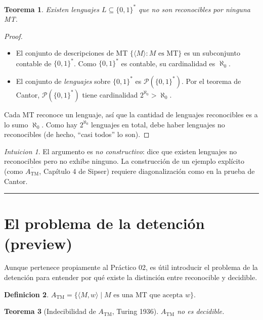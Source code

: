 \documentclass[11pt,a4paper]{article}
\theoremstyle{plain}
\newtheorem{teorema}{Teorema}[section]
\theoremstyle{definition}
\newtheorem{definicion}[teorema]{Definicion}
\theoremstyle{remark}
\newtheorem*{intuicion}{Intuicion}
\newcommand{\TM}{\mathrm{TM}}
\newcommand{\enc}[1]{\langle #1\rangle}
\newcommand{\ATM}{A_{\TM}}
\newcommand{\Pow}{\mathcal{P}}
\begin{document}
\begin{teorema}
Existen lenguajes $L\subseteq\{0,1\}^*$ que no son reconocibles por
ninguna MT.
\end{teorema}

\begin{proof}
\begin{itemize}
  \item El conjunto de descripciones de MT $\{\enc{M}: M\text{ es MT}\}$
        es un subconjunto contable de $\{0,1\}^*$. Como $\{0,1\}^*$ es
        contable, su cardinalidad es $\aleph_0$.
  \item El conjunto de \emph{lenguajes} sobre $\{0,1\}^*$ es
        $\Pow(\{0,1\}^*)$. Por el teorema de Cantor, $\Pow(\{0,1\}^*)$
        tiene cardinalidad $2^{\aleph_0}>\aleph_0$.
\end{itemize}
Cada MT reconoce un lenguaje, as\'i que la cantidad de lenguajes
reconocibles es a lo sumo $\aleph_0$. Como hay $2^{\aleph_0}$ lenguajes en
total, debe haber lenguajes no reconocibles (de hecho, ``casi todos'' lo
son).
\end{proof}

\begin{intuicion}
El argumento es \emph{no constructivo}: dice que existen lenguajes no
reconocibles pero no exhibe ninguno. La construcci\'on de un ejemplo
expl\'icito (como $\overline{\ATM}$, Cap\'itulo 4 de Sipser) requiere
diagonalizaci\'on como en la prueba de Cantor.
\end{intuicion}

\bigskip\hrule\bigskip

\section{El problema de la detenci\'on (preview)}
\label{sec:halting}

Aunque pertenece propiamente al Pr\'actico 02, es \'util introducir el
problema de la detenci\'on para entender por qu\'e existe la distinci\'on
entre reconocible y decidible.

\begin{definicion}
\(\ATM = \{\enc{M,w} \mid M \text{ es una MT que acepta } w\}.\)
\end{definicion}

\begin{teorema}[Indecibilidad de $\ATM$, Turing 1936]
$\ATM$ no es decidible.
\end{teorema}
\end{document}
